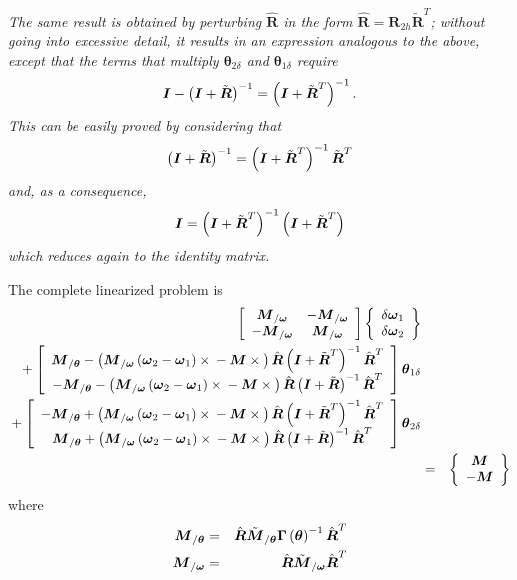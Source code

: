 \documentclass[10pt,dvips,fleqn]{report}
\newcommand{\T}[1]{\boldsymbol{#1}}
\begin{document}
\emph{The same result is obtained by perturbing 
$\hat{\T{R}}$ in the form $\hat{\T{R}}=\T{R}_{2h}\tilde{\T{R}}^T$; 
without going into excessive detail, it results 
in an expression analogous to the above, except that the terms
that multiply $\T{\theta}_{2\delta}$ and $\T{\theta}_{1\delta}$
require
\begin{equation}
	\T{I} - \plbr{\T{I} + \tilde{\T{R}}}^{-1} = \plbr{\T{I} + \tilde{\T{R}}^T}^{-1} .
\end{equation}
This can be easily proved by considering that
\begin{equation}
	\plbr{\T{I} + \tilde{\T{R}}}^{-1} = \plbr{\T{I} + \tilde{\T{R}}^T}^{-1} \tilde{\T{R}}^T
\end{equation}
and, as a consequence,
\begin{equation}
	\T{I} = \plbr{\T{I} + \tilde{\T{R}}^T}^{-1} \plbr{\T{I} + \tilde{\T{R}}^T}
\end{equation}
which reduces again to the identity matrix.}



The complete linearized problem is
\begin{eqnarray*}
	\sqbr{\matr{cc}{
		\T{M}_{/\T{\omega}} & - \T{M}_{/\T{\omega}} \\
		- \T{M}_{/\T{\omega}} & \T{M}_{/\T{\omega}}
	}}\cubr{\cvvect{
		\delta\T{\omega}_1 \\
		\delta\T{\omega}_2
	}} & & \\
	\mbox{} + \sqbr{\cvvect{
		\T{M}_{/\T{\theta}}
		- \plbr{
			\T{M}_{/\T{\omega}} \plbr{\T{\omega}_2 - \T{\omega}_1} \times{}
			- \T{M}\times{}
		} \hat{\T{R}} \plbr{\T{I} + \tilde{\T{R}}^T}^{-1} \hat{\T{R}}^T \\
		- \T{M}_{/\T{\theta}}
		- \plbr{
			\T{M}_{/\T{\omega}} \plbr{\T{\omega}_2 - \T{\omega}_1} \times{}
			- \T{M}\times{}
		} \hat{\T{R}} \plbr{\T{I} + \tilde{\T{R}}}^{-1} \hat{\T{R}}^T
	}} \T{\theta}_{1\delta} & & \\
	\mbox{} + \sqbr{\cvvect{
		- \T{M}_{/\T{\theta}}
		+ \plbr{
			\T{M}_{/\T{\omega}} \plbr{\T{\omega}_2 - \T{\omega}_1} \times{}
			- \T{M}\times{}
		} \hat{\T{R}} \plbr{\T{I} + \tilde{\T{R}}^T}^{-1} \hat{\T{R}}^T \\
		\T{M}_{/\T{\theta}}
		+ \plbr{
			\T{M}_{/\T{\omega}} \plbr{\T{\omega}_2 - \T{\omega}_1} \times{}
			- \T{M}\times{}
		} \hat{\T{R}} \plbr{\T{I} + \tilde{\T{R}}}^{-1} \hat{\T{R}}^T
	}} \T{\theta}_{2\delta} & & \\
	& = & \cubr{\cvvect{
		\T{M} \\
		- \T{M}
	}}
\end{eqnarray*}
where
\begin{eqnarray*}
	\T{M}_{/\T{\theta}} & = & \hat{\T{R}} \tilde{\T{M}}_{/\T{\theta}} \T{\Gamma}\plbr{\T{\theta}}^{-1} \hat{\T{R}}^T \\
	\T{M}_{/\T{\omega}} & = & \hat{\T{R}} \tilde{\T{M}}_{/\T{\omega}} \hat{\T{R}}^T
\end{eqnarray*}
\end{document}
